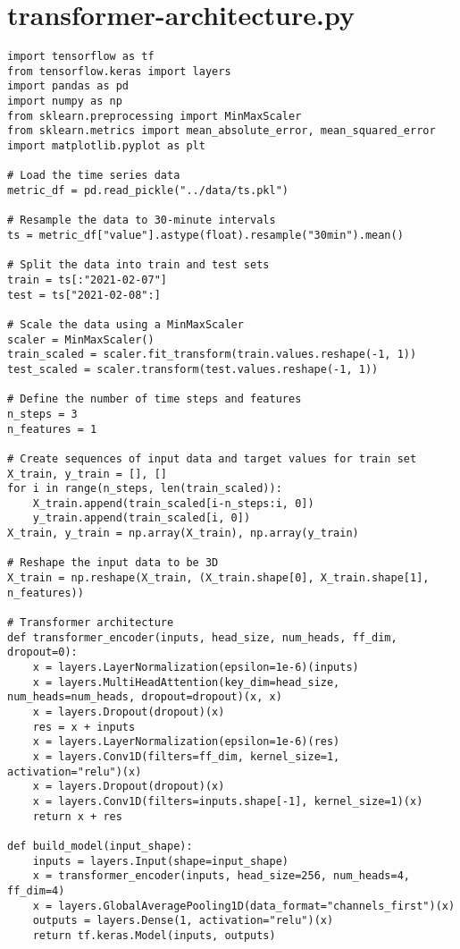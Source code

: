\chapter{transformer-architecture.py}
\label{appendix:b}
\begin{lstlisting}
import tensorflow as tf
from tensorflow.keras import layers
import pandas as pd
import numpy as np
from sklearn.preprocessing import MinMaxScaler
from sklearn.metrics import mean_absolute_error, mean_squared_error
import matplotlib.pyplot as plt

# Load the time series data
metric_df = pd.read_pickle("../data/ts.pkl")

# Resample the data to 30-minute intervals
ts = metric_df["value"].astype(float).resample("30min").mean()

# Split the data into train and test sets
train = ts[:"2021-02-07"]
test = ts["2021-02-08":]

# Scale the data using a MinMaxScaler
scaler = MinMaxScaler()
train_scaled = scaler.fit_transform(train.values.reshape(-1, 1))
test_scaled = scaler.transform(test.values.reshape(-1, 1))

# Define the number of time steps and features
n_steps = 3
n_features = 1

# Create sequences of input data and target values for train set
X_train, y_train = [], []
for i in range(n_steps, len(train_scaled)):
    X_train.append(train_scaled[i-n_steps:i, 0])
    y_train.append(train_scaled[i, 0])
X_train, y_train = np.array(X_train), np.array(y_train)

# Reshape the input data to be 3D
X_train = np.reshape(X_train, (X_train.shape[0], X_train.shape[1], n_features))

# Transformer architecture
def transformer_encoder(inputs, head_size, num_heads, ff_dim, dropout=0):
    x = layers.LayerNormalization(epsilon=1e-6)(inputs)
    x = layers.MultiHeadAttention(key_dim=head_size, num_heads=num_heads, dropout=dropout)(x, x)
    x = layers.Dropout(dropout)(x)
    res = x + inputs
    x = layers.LayerNormalization(epsilon=1e-6)(res)
    x = layers.Conv1D(filters=ff_dim, kernel_size=1, activation="relu")(x)
    x = layers.Dropout(dropout)(x)
    x = layers.Conv1D(filters=inputs.shape[-1], kernel_size=1)(x)
    return x + res

def build_model(input_shape):
    inputs = layers.Input(shape=input_shape)
    x = transformer_encoder(inputs, head_size=256, num_heads=4, ff_dim=4)
    x = layers.GlobalAveragePooling1D(data_format="channels_first")(x)
    outputs = layers.Dense(1, activation="relu")(x)
    return tf.keras.Model(inputs, outputs)


\end{lstlisting}
